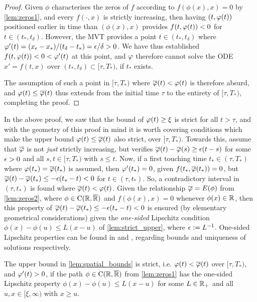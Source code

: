 \begin{proof}
    Given $\phi$ characterises the zeros of $f$ according to $f(\phi(x),x)=0$ by \autoref{lem:zeros1}, and every $f(\cdot,x)$ is strictly increasing, then having $(t,\varphi(t))$ positioned earlier in time than $(\phi(x),x)$ provides $f(t,\varphi(t))<0$ for $t\in(t_*,t_\delta)$. However, the MVT provides a point $t\in(t_*,t_\delta)$ where $\varphi'(t)=(x_\epsilon-x_*)/(t_\delta-t_*)=\epsilon/\delta>0$. We have thus established  $f(t,\varphi(t))<0<\varphi'(t)$ at this point, and $\varphi$ therefore cannot solve the ODE $x'=f(t,x)$ over $(t_*,t_\delta)\subset[\tau,T_*)$, if $t_*$ exists.

    The assumption of such a point in $[\tau,T_*)$ where $\overline{\varphi}(t)<\varphi(t)$ is therefore absurd, and $\varphi(t)\le\overline{\varphi}(t)$ thus extends from the initial time $\tau$ to the entirety of $[\tau,T_*)$, completing the proof.
\end{proof}

In the above proof, we saw that the bound of $\varphi(t)\ge\xi$ is strict for all $t>\tau$, and with the geometry of this proof in mind it is worth covering conditions which make the upper bound $\varphi(t)\le\overline{\varphi}(t)$ also strict, over $[\tau,T_*)$. Towards this, assume that $\overline{\varphi}$ is not \emph{just} strictly increasing, but verifies $\overline{\varphi}(t)-\overline{\varphi}(s)\ge\epsilon(t-s)$ for some $\epsilon>0$ and all $s,t\in[\tau,T_*)$ with $s\le t$. Now, if a first touching time $t_*\in(\tau,T_*)$ where $\varphi(t_*)=\overline{\varphi}(t_*)$ is assumed, then $\varphi'(t_*)=0$, given $f(t_*,\overline{\varphi}(t_*))=0$, but $\overline{\varphi}(t)-\overline{\varphi}(t_*)\le-\epsilon(t_*-t)<0$ for $t\in(\tau,t_*)$. So, a contradictory interval in $(\tau,t_*)$ is found where $\overline{\varphi}(t)<\varphi(t)$. Given the relationship $\overline{\varphi}=E(\phi)$ from \autoref{lem:zeros2}, where $\phi\in\mathrm{C}(\mathbb{R},{\overline{\mathbb{R}}})$ and $f(\phi(x),x)=0$ whenever $\phi(x)\in\mathbb{R}$, then this property of $\overline{\varphi}(t)-\overline{\varphi}(t_*)\le-\epsilon(t_*-t)<0$ is ensured (by elementary geometrical considerations) given the \emph{one-sided} Lipschitz condition $\phi(x) - \phi(u) \le L (x - u)$ of \autoref{lem:strict_upper}, where $\epsilon:=L^{-1}$. One-sided Lipschitz properties can be found in \cite{lakshmikantham_1969} and \cite{agarwal_1993}, regarding bounds and uniqueness of solutions respectively.

\begin{lemma}\label{lem:strict_upper}
    The upper bound in \autoref{lem:spatial_bounds} is strict, i.e. $\varphi(t)<\overline{\varphi}(t)$ over $[\tau,T_*)$, and $\varphi'(t)>0$, if the path $\phi\in\mathrm{C}(\mathbb{R},{\overline{\mathbb{R}}})$ from \autoref{lem:zeros1} has the one-sided Lipschitz property $\phi(x) - \phi(u) \le L (x - u)$ for some $L\in\mathbb{R}_+$ and all $u,x\in[\xi,\infty)$ with $x\ge u$.
\end{lemma}

